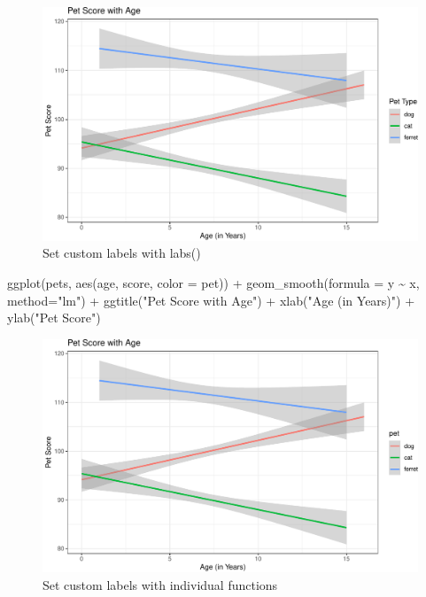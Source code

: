 \documentclass[
  oneside]{book}
\newenvironment{Shaded}{\begin{snugshade}}{\end{snugshade}}
\newcommand{\AttributeTok}[1]{\textcolor[rgb]{0.77,0.63,0.00}{#1}}
\newcommand{\FunctionTok}[1]{\textcolor[rgb]{0.00,0.00,0.00}{#1}}
\newcommand{\NormalTok}[1]{#1}
\newcommand{\SpecialCharTok}[1]{\textcolor[rgb]{0.00,0.00,0.00}{#1}}
\newcommand{\StringTok}[1]{\textcolor[rgb]{0.31,0.60,0.02}{#1}}
\begin{document}
\begin{figure}

{\centering \includegraphics[width=0.9\linewidth]{images/line-labels1-1} 

}

\caption{Set custom labels with labs()}\label{fig:line-labels1}
\end{figure}

\begin{Shaded}
\begin{Highlighting}[]
\FunctionTok{ggplot}\NormalTok{(pets, }\FunctionTok{aes}\NormalTok{(age, score, }\AttributeTok{color =}\NormalTok{ pet)) }\SpecialCharTok{+}
  \FunctionTok{geom\_smooth}\NormalTok{(}\AttributeTok{formula =}\NormalTok{ y }\SpecialCharTok{\textasciitilde{}}\NormalTok{ x, }\AttributeTok{method=}\StringTok{"lm"}\NormalTok{) }\SpecialCharTok{+}
  \FunctionTok{ggtitle}\NormalTok{(}\StringTok{"Pet Score with Age"}\NormalTok{) }\SpecialCharTok{+}
  \FunctionTok{xlab}\NormalTok{(}\StringTok{"Age (in Years)"}\NormalTok{) }\SpecialCharTok{+}
  \FunctionTok{ylab}\NormalTok{(}\StringTok{"Pet Score"}\NormalTok{)}
\end{Highlighting}
\end{Shaded}

\begin{figure}

{\centering \includegraphics[width=0.9\linewidth]{images/line-labels2-1} 

}

\caption{Set custom labels with individual functions}\label{fig:line-labels2}
\end{figure}
\end{document}
